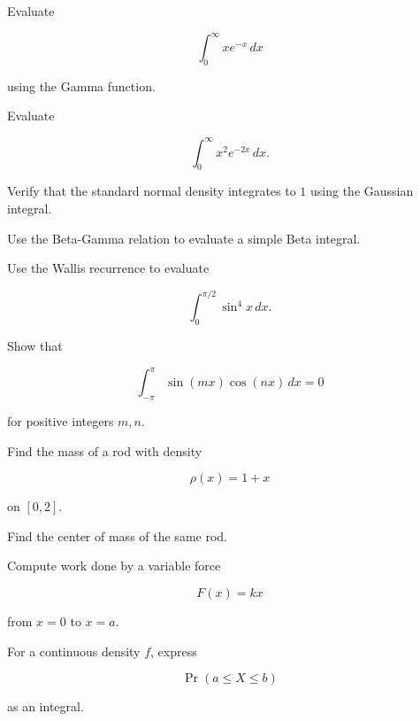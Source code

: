 \begin{exercise}[3]
Evaluate

\[
\int_0^\infty
xe^{-x}
\,dx
\]

using the Gamma function.
\end{exercise}

\begin{exercise}[3]
Evaluate

\[
\int_0^\infty
x^2e^{-2x}
\,dx.
\]
\end{exercise}

\begin{exercise}[3]
Verify that the standard normal density integrates to \(1\) using the
Gaussian integral.
\end{exercise}

\begin{exercise}[3]
Use the Beta-Gamma relation to evaluate a simple Beta integral.
\end{exercise}

\begin{exercise}[3]
Use the Wallis recurrence to evaluate

\[
\int_0^{\pi/2}
\sin^4x
\,dx.
\]
\end{exercise}

\begin{exercise}[3]
Show that

\[
\int_{-\pi}^{\pi}
\sin(mx)\cos(nx)
\,dx
=
0
\]

for positive integers \(m,n\).
\end{exercise}

\begin{exercise}[3]
Find the mass of a rod with density

\[
\rho(x)
=
1+x
\]

on \([0,2]\).
\end{exercise}

\begin{exercise}[3]
Find the center of mass of the same rod.
\end{exercise}

\begin{exercise}[3]
Compute work done by a variable force

\[
F(x)=kx
\]

from \(x=0\) to \(x=a\).
\end{exercise}

\begin{exercise}[3]
For a continuous density \(f\), express

\[
\Pr(a\leq X\leq b)
\]

as an integral.
\end{exercise}

